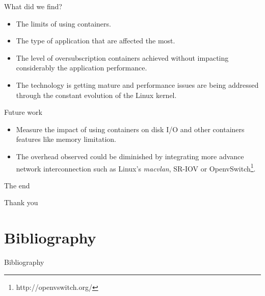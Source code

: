 \documentclass[presentation]{beamer}
\begin{document}
\begin{frame}[label=sec-4-2]{What did we find?}
\begin{itemize}
\item The limits of using containers.
\item The type of application that are affected the most.
\item The level of oversubscription containers achieved without impacting considerably the application performance.
\item The technology is getting mature and performance issues are being addressed through the constant evolution of the Linux kernel.
\end{itemize}
\end{frame}


\begin{frame}[label=sec-4-3]{Future work}
\begin{itemize}
\item Measure the impact of using containers on disk I/O and other
containers features like memory limitation.

\item The overhead observed could be diminished by integrating
more advance network interconnection such as Linux's \emph{macvlan}, SR-IOV or OpenvSwitch\footnote{http://openvswitch.org/}.
\end{itemize}
\end{frame}

{
\begin{frame}[label=sec-4-4]{The end}

\vspace{3cm}
\par { {\center Thank you} }\par
\vspace{3cm}\hfill
\end{frame}
}



\section{Bibliography}
\label{sec-5}
\begin{frame}[label=sec-5-1]{Bibliography}



\appendix
\end{frame}
\end{document}
